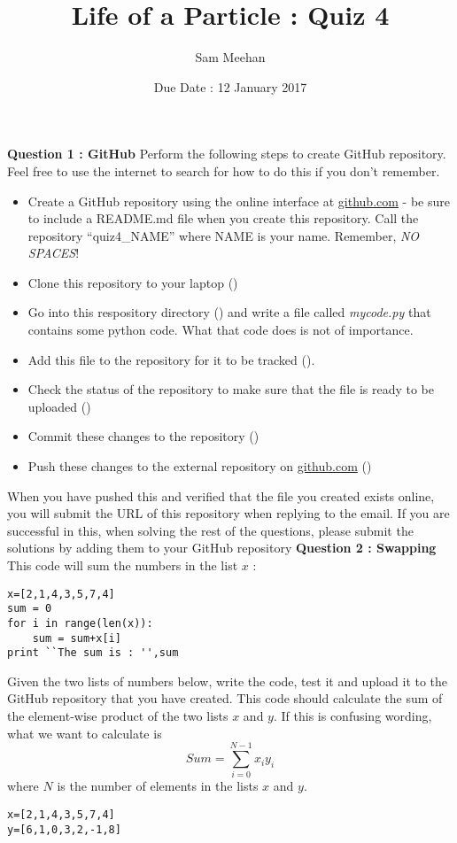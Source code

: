 \documentclass[12pt]{article}
\title{Life of a Particle : Quiz 4}
\author{Sam Meehan}
\date{Due Date : 12 January 2017}
\begin{document}
\maketitle

\textbf{Question 1 : GitHub}
Perform the following steps to create GitHub repository.  Feel free to use the internet to search for how to do this if you don't remember.
\begin{itemize}[noitemsep]
\item Create a GitHub repository using the online interface at \href{https://github.com}{github.com} - be sure to include a README.md file when you create this repository.  Call the repository ``quiz4\_NAME'' where NAME is your name.  Remember, \textit{NO SPACES}!
\item Clone this repository to your laptop (\small{})
\item Go into this respository directory (\small{}) and write a file called \textit{mycode.py} that contains some python code.  What that code does is not of importance.
\item Add this file to the repository for it to be tracked (\small{}).
\item Check the status of the repository to make sure that the file is ready to be uploaded (\small{})
\item Commit these changes to the repository (\small{})
\item Push these changes to the external repository on \href{https://github.com}{github.com} (\small{})
\end{itemize}
When you have pushed this and verified that the file you created exists online, you will submit the URL of this repository when replying to the email.  If you are successful in this, when solving the rest of the questions, please submit the solutions by adding them to your GitHub repository 
\newline
\newline
\textbf{Question 2 : Swapping}
This code will sum the numbers in the list $x$ :
\begin{lstlisting}
x=[2,1,4,3,5,7,4]
sum = 0
for i in range(len(x)):
	sum = sum+x[i]
print ``The sum is : '',sum
\end{lstlisting}
Given the two lists of numbers below, write the code, test it and upload it to the GitHub repository that you have created.  This code should calculate the sum of the element-wise product of the two lists $x$ and $y$.  If this is confusing wording, what we want to calculate is $$Sum=\sum_{i=0}^{N-1} x_{i}y_{i}$$ where $N$ is the number of elements in the lists $x$ and $y$.
\begin{lstlisting}
x=[2,1,4,3,5,7,4]
y=[6,1,0,3,2,-1,8]
\end{lstlisting}
\end{document}
